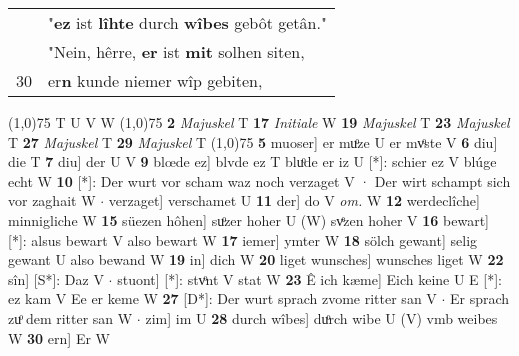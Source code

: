 \documentclass[8pt,a4paper,notitlepage]{article}
\begin{document}
\begin{table}[ht]
\begin{minipage}[t]{0.5\linewidth}
\begin{tabular}{rl}
 & "\textbf{ez} ist \textbf{lîhte} durch \textbf{wîbes} gebôt getân."\\ 
 & "Nein, hêrre, \textbf{er} ist \textbf{mit} solhen siten,\\ 
30 & er\textbf{n} kunde niemer wîp gebiten,\\ 
\end{tabular}
\scriptsize
\line(1,0){75} \newline
T U V W \newline
\line(1,0){75} \newline
\textbf{2} \textit{Majuskel} T  \textbf{17} \textit{Initiale} W  \textbf{19} \textit{Majuskel} T  \textbf{23} \textit{Majuskel} T  \textbf{27} \textit{Majuskel} T  \textbf{29} \textit{Majuskel} T  \newline
\line(1,0){75} \newline
\textbf{5} muoser] er muͦze U er mvͦste V \textbf{6} diu] die T \textbf{7} diu] der U V \textbf{9} blœde ez] blvde ez T bluͦde er iz U [*]: schier ez V blúge echt W \textbf{10} [*]: Der wurt vor scham waz noch verzaget V · Der wirt schampt sich vor zaghait W  $\cdot$ verzaget] verschamet U \textbf{11} der] do V \textit{om.} W \textbf{12} werdeclîche] minnigliche W \textbf{15} süezen hôhen] suͦzer hoher U (W) svͤzen hoher V \textbf{16} bewart] [*]: alsus bewart V also bewart W \textbf{17} iemer] ymter W \textbf{18} sölch gewant] selig gewant U also bewand W \textbf{19} in] dich W \textbf{20} liget wunsches] wunsches liget W \textbf{22} sîn] [S*]: Daz V  $\cdot$ stuont] [*]: stvͦnt V stat W \textbf{23} Ê ich kæme] Eich keine U E [*]: ez kam V Ee er keme W \textbf{27} [D*]: Der wurt sprach zvome ritter san V  $\cdot$ Er sprach zuͦ dem ritter san W  $\cdot$ zim] im U \textbf{28} durch wîbes] duͦrch wibe U (V) vmb weibes W \textbf{30} ern] Er W \newline
\end{minipage}
\end{table}
\end{document}
